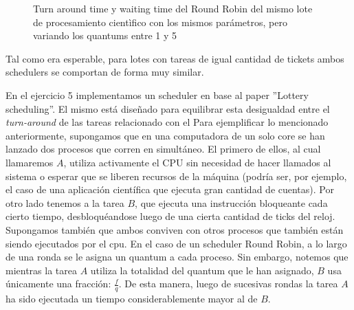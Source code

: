 \begin{figure}
\hfill
{}
\hfill
{}
\hfill
\caption{Turn around time y waiting time del Round Robin del mismo lote de procesamiento cientìfico con los mismos parámetros,
	pero variando los quantums entre 1 y 5}
\end{figure}

Tal como era esperable, para lotes con tareas de igual cantidad de tickets ambos schedulers se comportan de forma muy similar.




En el ejercicio 5 implementamos un scheduler en base al paper ''Lottery scheduling''. El mismo está diseñado para equilibrar esta desigualdad entre el \emph{turn-around} de las tareas relacionado con el
Para ejemplificar lo mencionado anteriormente, supongamos que en una computadora de un solo core se han lanzado dos procesos que corren en simultáneo. El primero de ellos, al cual llamaremos $A$, utiliza
activamente el CPU sin necesidad de hacer llamados al sistema o esperar que se liberen recursos de la máquina (podría ser, por ejemplo, el caso de una aplicación científica que ejecuta gran cantidad de 
cuentas). Por otro lado tenemos a la tarea $B$, que ejecuta una instrucción bloqueante cada cierto tiempo, desbloquéandose luego de una cierta cantidad de ticks del reloj. Supongamos también que ambos conviven
con otros procesos que también están siendo ejecutados por el cpu. En el caso de un scheduler Round Robin, a lo largo de una ronda se le asigna un quantum a cada proceso. Sin embargo, notemos que mientras
la tarea $A$ utiliza la totalidad del quantum que le han asignado, $B$ usa únicamente una fracción: $\frac{f}{q}$. De esta manera, luego de sucesivas rondas la tarea $A$ ha sido ejecutada un tiempo
considerablemente mayor al de $B$.

